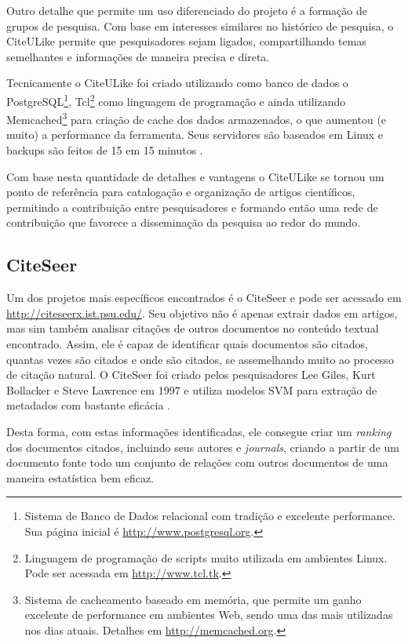 Outro detalhe que permite um uso diferenciado do projeto é a formação de grupos de pesquisa. Com base em interesses similares no histórico de pesquisa, o CiteULike permite que pesquisadores sejam ligados, compartilhando temas semelhantes e informações de maneira precisa e direta.

Tecnicamente o CiteULike foi criado utilizando como banco de dados o PostgreSQL\footnote{Sistema de Banco de Dados relacional com tradição e excelente performance. Sua página inicial é \url{http://www.postgresql.org}.}, Tcl\footnote{Linguagem de programação de scripts muito utilizada em ambientes Linux. Pode ser acessada em \url{http://www.tcl.tk}.} como linguagem de programação e ainda utilizando Memcached\footnote{Sistema de cacheamento baseado em memória, que permite um ganho excelente de performance em ambientes Web, sendo uma das mais utilizadas nos dias atuais. Detalhes em \url{http://memcached.org}.} para criação de cache dos dados armazenados, o que aumentou (e muito) a performance da ferramenta. Seus servidores são baseados em Linux e backups são feitos de 15 em 15 minutos \cite{citeulike}.

Com base nesta quantidade de detalhes e vantagens o CiteULike se tornou um ponto de referência para catalogação e organização de artigos científicos, permitindo a contribuição entre pesquisadores e formando então uma rede de contribuição que favorece a disseminação da pesquisa ao redor do mundo.

\subsection{CiteSeer}
\label{ssec:citeseer}

Um dos projetos mais específicos encontrados é o CiteSeer \cite{citeseer} e pode ser acessado em \url{http://citeseerx.ist.psu.edu/}. Seu objetivo não é apenas extrair dados em artigos, mas sim também analisar citações de outros documentos no conteúdo textual encontrado. Assim, ele é capaz de identificar quais documentos são citados, quantas vezes são citados e onde são citados, se assemelhando muito ao processo de citação natural. O CiteSeer foi criado pelos pesquisadores Lee Giles, Kurt Bollacker e Steve Lawrence em 1997 e utiliza modelos SVM para extração de metadados com bastante eficácia \cite{Granitzer-2012-LayoutBased}.

Desta forma, com estas informações identificadas, ele consegue criar um \textit{ranking} dos documentos citados, incluindo seus autores e \textit{journals}, criando a partir de um documento fonte todo um conjunto de relações com outros documentos de uma maneira estatística bem eficaz.

